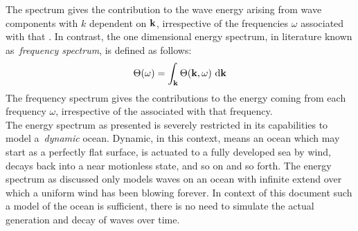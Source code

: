 The \wavenumber spectrum gives the contribution to the wave energy arising from
wave components with \wavenumber $k$ dependent on \wavevector $\mathbf{k}$,
irrespective of the frequencies $\omega$ associated with that \wavenumber. In
contrast, the one dimensional energy spectrum, in literature known
as~\emph{frequency spectrum}, is defined as follows:
\begin{equation}
\label{eq:energy_spectrum_1d}
 \Theta(\omega) = \int_{\mathbf{k}} \Theta(\mathbf{k}, \omega)~\mathrm{d}\mathbf{k}
\end{equation}
The frequency spectrum gives the contributions to the energy coming from each
frequency $\omega$, irrespective of the \wavenumbers associated with that
frequency.\\

The energy spectrum as presented is severely restricted in its
capabilities to model a~\emph{dynamic} ocean. Dynamic, in this context, means an
ocean which may start as a perfectly flat surface, is actuated to a fully
developed sea by wind, decays back into a near motionless state, and so on and
so forth. The energy spectrum as discussed only models waves on an ocean with
infinite extend over which a uniform wind has been blowing forever. In context
of this document such a model of the ocean is sufficient, there is no need to
simulate the actual generation and decay of waves over time.

